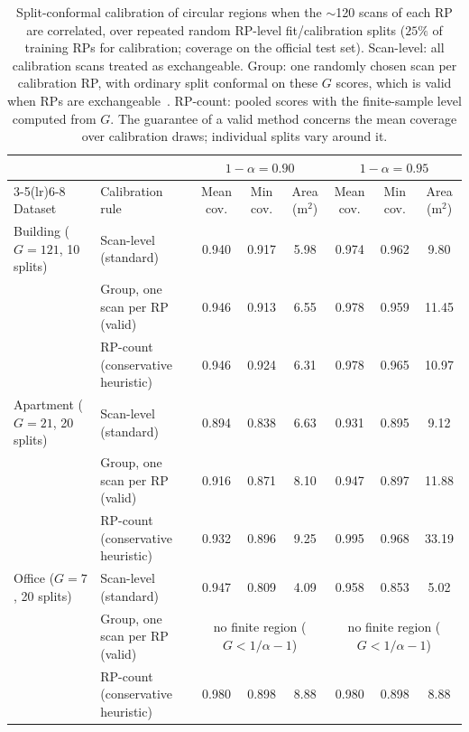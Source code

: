 \begin{table}[!t]
\centering
\caption{Split-conformal calibration of circular regions when the $\sim$120 scans of each RP are correlated, over repeated random RP-level fit/calibration splits ($25\%$ of training RPs for calibration; coverage on the official test set). Scan-level: all calibration scans treated as exchangeable. Group: one randomly chosen scan per calibration RP, with ordinary split conformal on these $G$ scores, which is valid when RPs are exchangeable~\cite{Dunn02102023}. RP-count: pooled scores with the finite-sample level computed from $G$. The guarantee of a valid method concerns the mean coverage over calibration draws; individual splits vary around it.}
\label{tab:calibration_rules}
\footnotesize
\setlength{\tabcolsep}{4pt}
\begin{tabular}{llcccccc}
\toprule
 & & \multicolumn{3}{c}{$1-\alpha=0.90$} & \multicolumn{3}{c}{$1-\alpha=0.95$} \\
\cmidrule(lr){3-5}\cmidrule(lr){6-8}
Dataset & Calibration rule & Mean cov. & Min cov. & Area (m$^2$) & Mean cov. & Min cov. & Area (m$^2$) \\
\midrule
Building ($G=121$, 10 splits) & Scan-level (standard) & 0.940 & 0.917 & 5.98 & 0.974 & 0.962 & 9.80 \\
 & Group, one scan per RP (valid) & 0.946 & 0.913 & 6.55 & 0.978 & 0.959 & 11.45 \\
 & RP-count (conservative heuristic) & 0.946 & 0.924 & 6.31 & 0.978 & 0.965 & 10.97 \\
\midrule
Apartment ($G=21$, 20 splits) & Scan-level (standard) & 0.894 & 0.838 & 6.63 & 0.931 & 0.895 & 9.12 \\
 & Group, one scan per RP (valid) & 0.916 & 0.871 & 8.10 & 0.947 & 0.897 & 11.88 \\
 & RP-count (conservative heuristic) & 0.932 & 0.896 & 9.25 & 0.995 & 0.968 & 33.19 \\
\midrule
Office ($G=7$, 20 splits) & Scan-level (standard) & 0.947 & 0.809 & 4.09 & 0.958 & 0.853 & 5.02 \\
 & Group, one scan per RP (valid) & \multicolumn{3}{c}{no finite region ($G<1/\alpha-1$)} & \multicolumn{3}{c}{no finite region ($G<1/\alpha-1$)} \\
 & RP-count (conservative heuristic) & 0.980 & 0.898 & 8.88 & 0.980 & 0.898 & 8.88 \\
\bottomrule
\end{tabular}
\end{table}

